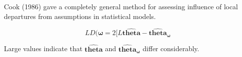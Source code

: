 

Cook (1986) gave a completely general method for assessing influence of local departures from
assumptions in statistical models.


\[  LD(\boldsymbol{\omega}= 2[ L\boldsymbol{\hat{theta}} - \boldsymbol{\hat{theta}_\omega} \]

Large values indicate that $\boldsymbol{\hat{theta}}$ and $\boldsymbol{\hat{theta}_\omega}$ differ considerably.
  
